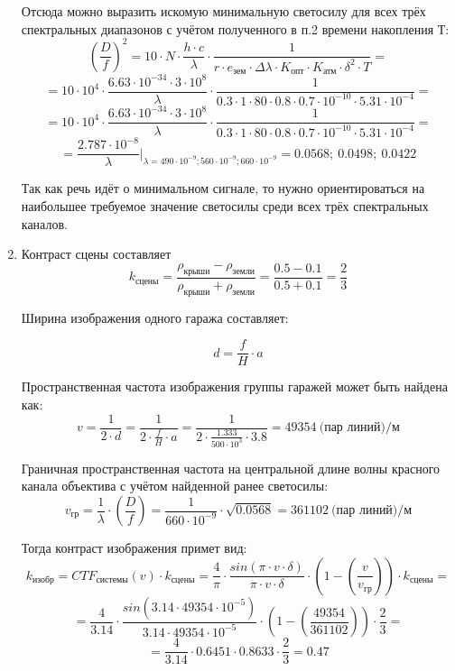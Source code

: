 \begin{enumerate}
Отсюда можно выразить искомую минимальную светосилу для всех трёх спектральных диапазонов с учётом полученного в п.2 времени накопления Т:
$$\left(\frac{D}{f}\right)^2=10\cdot N\cdot \frac{h\cdot c}{\lambda}\cdot \frac{1}{r\cdot e_\text{зем}\cdot \Delta \lambda\cdot K_\text{опт}\cdot K_\text{атм}\cdot \delta^2\cdot T}=$$
$$=10\cdot 10^4\cdot \frac{6.63\cdot 10^{-34}\cdot 3\cdot 10^8}{\lambda}\cdot \frac{1}{0.3\cdot 1\cdot 80\cdot 0.8\cdot 0.7\cdot 10^{-10}\cdot 5.31\cdot 10^{-4}}=$$
$$=10\cdot 10^4\cdot \frac{6.63\cdot 10^{-34}\cdot 3\cdot 10^8}{\lambda}\cdot \frac{1}{0.3\cdot 1\cdot 80\cdot 0.8\cdot 0.7\cdot 10^{-10}\cdot 5.31\cdot 10^{-4} }=$$
$$=\frac{2.787\cdot 10^{-8}}{\lambda}\left.\right|_{\lambda=490\cdot 10^{-9}; 560\cdot 10^{-9}  ; 660\cdot 10^{-9}  }=0.0568; \: 0.0498; \: 0.0422$$

Так как речь идёт о минимальном сигнале, то нужно ориентироваться на наибольшее требуемое значение светосилы среди всех трёх спектральных каналов.

\item Контраст сцены составляет
$$k_\text{сцены}=\frac{\rho_\text{крыши}-\rho_\text{земли}}{\rho_\text{крыши}+\rho_\text{земли}}=\frac{0.5-0.1}{0.5+0.1}=\frac{2}{3}$$

Ширина изображения одного гаража составляет:

$$d=\frac{f}{H}\cdot a$$

Пространственная частота изображения группы гаражей может быть найдена как:
$$v=\frac{1}{2\cdot d}=\frac{1}{2\cdot \frac{f}{H} \cdot a}=\frac{1}{2\cdot \frac{1.333}{500\cdot 10^3}\cdot 3.8}=49354 \: \text{(пар линий)/м}$$

Граничная пространственная частота на центральной длине волны красного канала объектива с учётом найденной ранее светосилы:
$$v_\text{гр}=\frac{1}{\lambda}\cdot  \left( \frac{D}{f} \right) =\frac{1}{660\cdot 10^{-9}}\cdot \sqrt{0.0568}=361102 \: \text{(пар линий)/м}$$

Тогда контраст изображения примет вид:
$$k_\text{изобр}=CTF_\text{системы}(v)\cdot k_\text{сцены}=\frac{4}{\pi} \cdot \frac{sin(\pi \cdot v\cdot \delta )}{\pi \cdot v\cdot \delta}\cdot \left(1-\left(\frac{v}{v_\text{гр}} \right) \right)\cdot k_\text{сцены}=$$
$$=\frac{4}{3.14}\cdot \frac{sin(3.14\cdot 49354\cdot 10^{-5})}{3.14\cdot 49354\cdot 10^{-5}}\cdot \left(1-\left(\frac{49354}{361102}\right)\right)\cdot \frac{2}{3}=$$
$$=\frac{4}{3.14}\cdot 0.6451\cdot 0.8633\cdot \frac{2}{3}=0.47$$

\end{enumerate}

